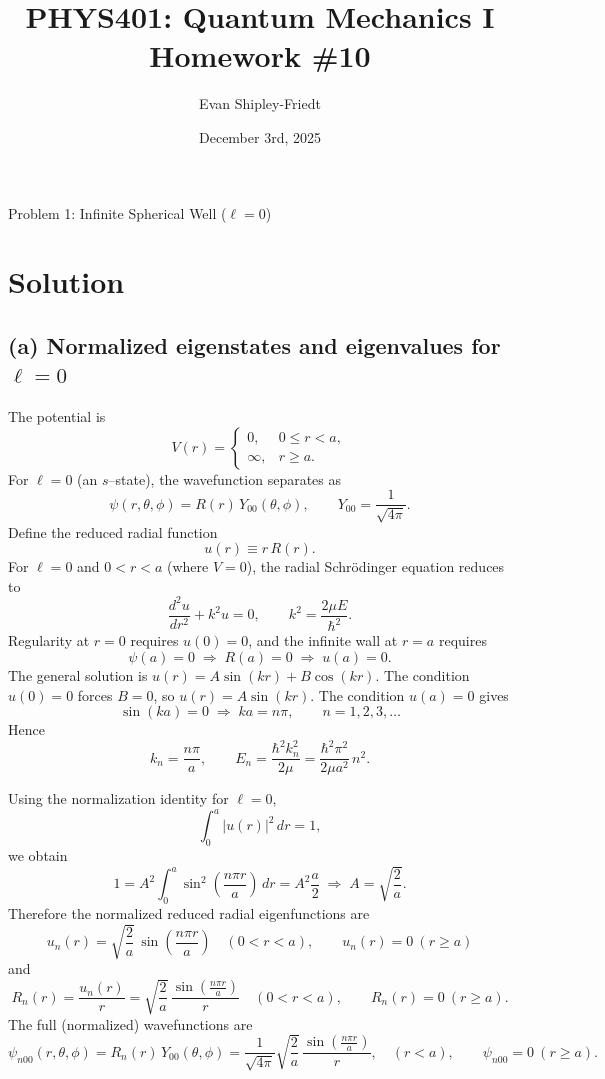 \documentclass{article}
\title{PHYS401: Quantum Mechanics I \\ Homework \#10}
\author{Evan Shipley-Friedt}
\date{December 3rd, 2025}
\begin{document}
\maketitle

{\huge Problem 1: Infinite Spherical Well ($\ell=0$)}

\section*{Solution}

\subsection*{(a) Normalized eigenstates and eigenvalues for $\ell=0$}

The potential is
\[
V(r)=
\begin{cases}
0, & 0\le r < a,\\
\infty, & r\ge a.
\end{cases}
\]
For $\ell=0$ (an $s$--state), the wavefunction separates as
\[
\psi(r,\theta,\phi)=R(r)\,Y_{00}(\theta,\phi),
\qquad
Y_{00}=\frac{1}{\sqrt{4\pi}}.
\]
Define the reduced radial function
\[
u(r)\equiv r\,R(r).
\]
For $\ell=0$ and $0<r<a$ (where $V=0$), the radial Schr\"odinger equation reduces to
\[
\frac{d^2u}{dr^2}+k^2u=0,
\qquad
k^2=\frac{2\mu E}{\hbar^2}.
\]
Regularity at $r=0$ requires $u(0)=0$, and the infinite wall at $r=a$ requires
\[
\psi(a)=0 \;\Rightarrow\; R(a)=0 \;\Rightarrow\; u(a)=0.
\]
The general solution is $u(r)=A\sin(kr)+B\cos(kr)$.  The condition $u(0)=0$ forces
$B=0$, so $u(r)=A\sin(kr)$.  The condition $u(a)=0$ gives
\[
\sin(ka)=0 \;\Rightarrow\; ka=n\pi,\qquad n=1,2,3,\dots
\]
Hence
\[
k_n=\frac{n\pi}{a},
\qquad
E_n=\frac{\hbar^2k_n^2}{2\mu}
=\frac{\hbar^2\pi^2}{2\mu a^2}\,n^2.
\]

Using the normalization identity for $\ell=0$,
\[
\int_0^a |u(r)|^2\,dr = 1,
\]
we obtain
\[
1=A^2\int_0^a \sin^2\!\left(\frac{n\pi r}{a}\right)\,dr
=A^2\frac{a}{2}
\;\Rightarrow\;
A=\sqrt{\frac{2}{a}}.
\]
Therefore the normalized reduced radial eigenfunctions are
\[
\boxed{
u_n(r)=\sqrt{\frac{2}{a}}\,
\sin\!\left(\frac{n\pi r}{a}\right)
\quad (0<r<a),
\qquad
u_n(r)=0\ (r\ge a)
}
\]
and
\[
\boxed{
R_n(r)=\frac{u_n(r)}{r}
=\sqrt{\frac{2}{a}}\,
\frac{\sin\!\left(\frac{n\pi r}{a}\right)}{r}
\quad (0<r<a),
\qquad
R_n(r)=0\ (r\ge a).
}
\]
The full (normalized) wavefunctions are
\[
\boxed{
\psi_{n00}(r,\theta,\phi)
=
R_n(r)\,Y_{00}(\theta,\phi)
=
\frac{1}{\sqrt{4\pi}}\sqrt{\frac{2}{a}}\,
\frac{\sin\!\left(\frac{n\pi r}{a}\right)}{r},
\quad (r<a),
\qquad
\psi_{n00}=0\ (r\ge a).
}
\]
\end{document}
